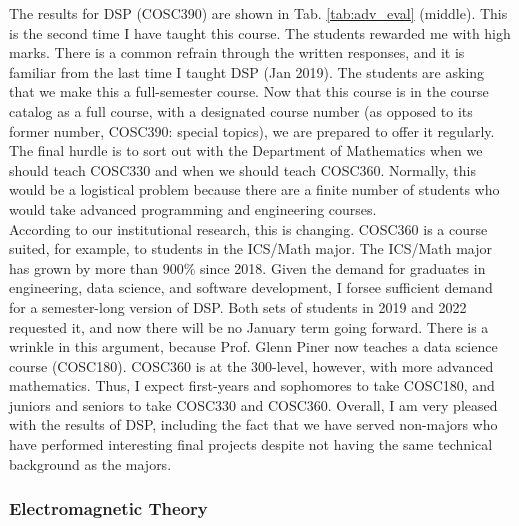 \documentclass[../../main.tex]{subfiles}
\begin{document}
The results for DSP (COSC390) are shown in Tab. \ref{tab:adv_eval} (middle).  This is the second time I have taught this course.  The students rewarded me with high marks.  There is a common refrain through the written responses, and it is familiar from the last time I taught DSP (Jan 2019).  The students are asking that we make this a full-semester course.  Now that this course is in the course catalog as a full course, with a designated course number (as opposed to its former number, COSC390: special topics), we are prepared to offer it regularly.  The final hurdle is to sort out with the Department of Mathematics when we should teach COSC330 and when we should teach COSC360.  Normally, this would be a logistical problem because there are a finite number of students who would take advanced programming and engineering courses.
\\
\vspace{0.15cm}
According to our institutional research, this is changing.  COSC360 is a course suited, for example, to students in the ICS/Math major.  The ICS/Math major has grown by more than 900\% since 2018.  Given the demand for graduates in engineering, data science, and software development, I forsee sufficient demand for a semester-long version of DSP.  Both sets of students in 2019 and 2022 requested it, and now there will be no January term going forward.  There is a wrinkle in this argument, because Prof. Glenn Piner now teaches a data science course (COSC180).  COSC360 is at the 300-level, however, with more advanced mathematics.  Thus, I expect first-years and sophomores to take COSC180, and juniors and seniors to take COSC330 and COSC360.  Overall, I am very pleased with the results of DSP, including the fact that we have served non-majors who have performed interesting final projects despite not having the same technical background as the majors.

\subsubsection{Electromagnetic Theory}
\end{document}
